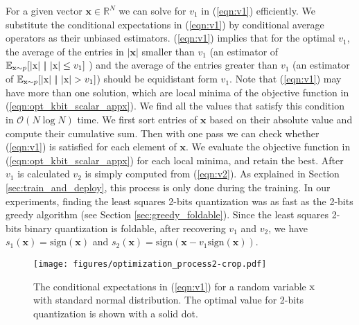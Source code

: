 \documentclass[10pt,twocolumn,letterpaper]{article}
\def\rx{{\textnormal{x}}}
\def\vx{{\bm{x}}}
\newcommand{\R}{\mathbb{R}}
\newcommand{\E}{\mathbb{E}}
\begin{document}
For a given vector $\vx \in \R^N$ we can solve for $v_1$ in (\ref{eqn:v1}) efficiently. We substitute the conditional expectations in (\ref{eqn:v1}) by conditional average operators as their unbiased estimators. (\ref{eqn:v1}) implies that for the optimal $v_1$, the average of the entries in $|\vx|$ smaller than $v_1$ (an estimator of $\E_{\rx\sim p}[ |\rx| ~\bm{|}~ |\rx| \le v_1]$ ) and the average of the entries greater than $v_1$ (an estimator of $\E_{\rx\sim p} [ |\rx| ~\bm{|}~ |\rx| > v_1] $) should be equidistant form $v_1$. 
Note that (\ref{eqn:v1}) may have more than one solution, which are local minima of the objective function in (\ref{eqn:opt_kbit_scalar_appx}).
We find all the values that satisfy this condition in $\mathcal{O}(N \log N)$ time. We first sort entries of $\vx$ based on their absolute value and compute their cumulative sum. Then with one pass we can check whether (\ref{eqn:v1}) is satisfied for each element of $\vx$. We evaluate the objective function in (\ref{eqn:opt_kbit_scalar_appx}) for each local minima, and retain the best.
After $v_1$ is calculated $v_2$ is simply computed from (\ref{eqn:v2}).
As explained in Section \ref{sec:train_and_deploy}, this process is only done during the training. In our experiments, finding the least squares 2-bits quantization was as fast as the 2-bits greedy algorithm (see Section \ref{sec:greedy_foldable}).
Since the least squares 2-bits binary quantization is foldable, after recovering $v_1$ and $v_2$, we have $s_1(\vx) = \text{sign}(\vx)$ and $s_2(\vx) =\text{sign}(\vx - v_1 \text{sign}(\vx))$.

\begin{figure}[htb!]
\begin{center}
\texttt{[image: figures/optimization\_process2-crop.pdf]}
\end{center}
\caption{The conditional expectations in (\ref{eqn:v1}) for a random variable $\rx$ with standard normal distribution. The optimal value for 2-bits quantization is shown with a solid dot.}
\label{fig:opt_processl}
\end{figure}

\end{document}
